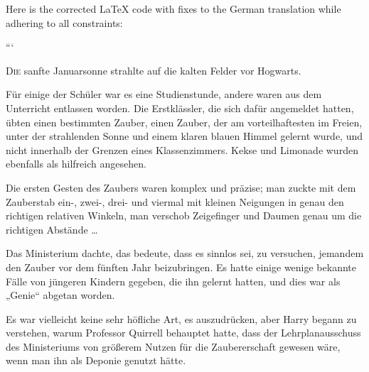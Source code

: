 Here is the corrected LaTeX code with fixes to the German translation while adhering to all constraints:

```

\lettrine{D}{ie} sanfte Januarsonne strahlte auf die kalten Felder vor Hogwarts.

Für einige der Schüler war es eine Studienstunde, andere waren aus dem Unterricht entlassen worden. Die Erstklässler, die sich dafür angemeldet hatten, übten einen bestimmten Zauber, einen Zauber, der am vorteilhaftesten im Freien, unter der strahlenden Sonne und einem klaren blauen Himmel gelernt wurde, und nicht innerhalb der Grenzen eines Klassenzimmers. Kekse und Limonade wurden ebenfalls als hilfreich angesehen.

Die ersten Gesten des Zaubers waren komplex und präzise; man zuckte mit dem Zauberstab ein-, zwei-, drei- und viermal mit kleinen Neigungen in genau den richtigen relativen Winkeln, man verschob Zeigefinger und Daumen genau um die richtigen Abstände …

Das Ministerium dachte, das bedeute, dass es sinnlos sei, zu versuchen, jemandem den Zauber vor dem fünften Jahr beizubringen. Es hatte einige wenige bekannte Fälle von jüngeren Kindern gegeben, die ihn gelernt hatten, und dies war als „Genie“ abgetan worden.

Es war vielleicht keine sehr höfliche Art, es auszudrücken, aber Harry begann zu verstehen, warum Professor Quirrell behauptet hatte, dass der Lehrplanausschuss des Ministeriums von größerem Nutzen für die Zaubererschaft gewesen wäre, wenn man ihn als Deponie genutzt hätte.

